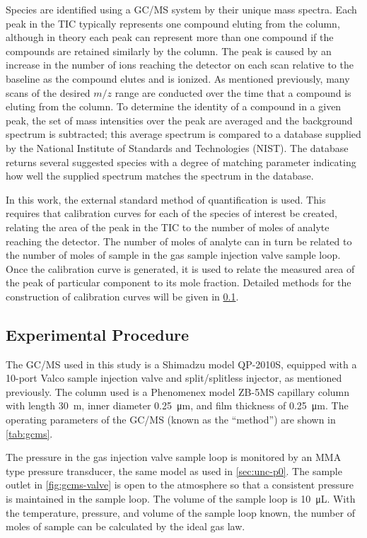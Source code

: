 \documentclass[../main.tex]{subfiles}
\begin{document}
Species are identified using a GC/MS system by their unique mass spectra.
Each peak in the TIC typically represents one compound eluting from the
column, although in theory each peak can represent more than one compound
if the compounds are retained similarly by the column. The peak is caused
by an increase in the number of ions reaching the detector on each scan
relative to the baseline as the compound elutes and is ionized. As
mentioned previously, many scans of the desired $m/z$ range are
conducted over the time that a compound is eluting from the column.
To determine the identity of a compound in a given peak, the set of
mass intensities over the peak are averaged and the background
spectrum is subtracted; this average spectrum is compared to a 
database supplied by the National Institute of Standards and 
Technologies (NIST). The database returns several suggested species
with a degree of matching parameter indicating how well the supplied
spectrum matches the spectrum in the database. 

In this work, the external standard method of quantification is used.
This requires that calibration curves for each of the species of
interest be created, relating the area of the peak in the TIC to
the number of moles of analyte reaching the detector. The number of
moles of analyte can in turn be related to the number of moles of
sample in the gas sample injection valve sample loop. Once the
calibration curve is generated, it is used to relate the measured
area of the peak of particular component to its mole fraction. Detailed
methods for the construction of calibration curves will be given in
\cref{sec:gcms-procedure}.

\subsection{Experimental Procedure}
\label{sec:gcms-procedure}

The GC/MS used in this study is a
Shimadzu model QP-2010S, equipped with a 10-port Valco sample injection
valve and split/splitless injector, as mentioned previously. The column
used is a Phenomenex model ZB-5MS capillary column
with length \SI{30}{\meter}, inner diameter \SI{0.25}{\micro\meter}, and film
thickness of \SI{0.25}{\micro\meter}. The operating parameters of the GC/MS
(known as the ``method'') are shown in \cref{tab:gcms}.

The pressure in the gas injection valve sample loop is monitored by an
MMA type pressure transducer, the same model as used in \cref{sec:unc-p0}. The
sample outlet in \cref{fig:gcms-valve} is open to the atmosphere
so that a consistent pressure is maintained in the sample loop.
The volume of the sample loop is \SI{10}{\micro\liter}. With
the temperature, pressure, and volume of the sample loop known,
the number of moles of sample can be calculated by the ideal
gas law.
\end{document}
